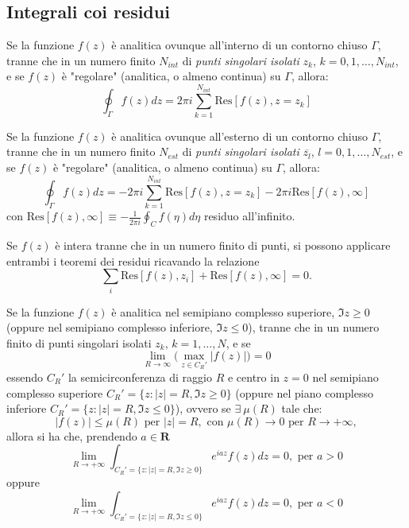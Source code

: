 \subsection*{Integrali coi residui}

\begin{theorem}
	Se la funzione $f(z)$ è analitica ovunque all'interno di un contorno chiuso $\Gamma$, tranne che in un numero finito $N_{int}$ di \textit{punti singolari isolati} $z_k$, $k=0,1,\dots,N_{int}$, e se $f(z)$ è "regolare" (analitica, o almeno continua) su $\Gamma$, allora:
    \[
    	\oint_\Gamma f(z) dz = 2\pi i \sum_{k=1}^{N_{int}} \text{Res}[f(z), z=z_k]
    \]
\end{theorem}
\begin{theorem}
	Se la funzione $f(z)$ è analitica ovunque all'esterno di un contorno chiuso $\Gamma$, tranne che in un numero finito $N_{est}$ di \textit{punti singolari isolati} $\overline{z_l}$, $l=0,1,\dots,N_{est}$, e se $f(z)$ è "regolare" (analitica, o almeno continua) su $\Gamma$, allora:
    \[
    	\oint_\Gamma f(z) dz = -2\pi i \sum_{k=1}^{N_{int}} \text{Res}[f(z), z=z_k] -2\pi i\text{Res}[f(z), \infty]
    \]
    con $\displaystyle \text{Res}[f(z), \infty]\equiv-\frac{1}{2\pi i}\oint_{C}f(\eta)d\eta$ residuo all'infinito.
\end{theorem}
Se $f(z)$ è intera tranne che in un numero finito di punti, si possono applicare entrambi i teoremi dei residui ricavando la relazione
\[
    \sum_i\text{Res}[f(z), z_i] + \text{Res}[f(z), \infty] =0.
\]
\begin{lemma}[di Jordan]
	Se la funzione $f(z)$ è analitica nel semipiano complesso superiore, $\Im z\ge 0$ (oppure nel semipiano complesso inferiore, $\Im z \le 0$), tranne che in un numero finito di punti singolari isolati $z_k$, $k=1,\dots,N$, e se 
    \[
        \lim_{R\to\infty}\Big( \max_{z\in C_{R}'}|f(z)|\Big)=0
    \]
    essendo $C_{R}'$ la semicirconferenza di raggio $R$ e centro in $z=0$ nel semipiano complesso superiore $C_{R}'=\{z:|z|=R, \Im z\ge0\}$ (oppure nel piano complesso inferiore $C_{R}'=\{z:|z|=R, \Im z\le0\}$), ovvero se $\exists\ \mu(R)$ tale che:
    \[
        |f(z)|\le\mu(R)\text{ per }|z|=R,\text{ con }\mu(R)\to0\text{ per }R\to+\infty,
    \]
    allora si ha che, prendendo $a\in \mathbf{R}$
    \[
        \lim_{R\to+\infty}\int_{C_{R}'=\{z:|z|=R, \Im z\ge0\}}e^{iaz}f(z)dz = 0,\text{ per }a>0
    \]
    oppure
    \[
        \lim_{R\to+\infty}\int_{C_{R}'=\{z:|z|=R, \Im z\le0\}}e^{iaz}f(z)dz = 0,\text{ per }a<0
    \]
\end{lemma}
